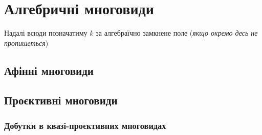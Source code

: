 \documentclass{math_library}
\begin{document}
%

\tableofcontents
\newpage

\section{Алгебричні многовиди}
Надалі всюди позначатиму $k$ за алгебраїчно замкнене поле (\textit{якщо окремо десь не пропишеться})

\subsection{Афінні многовиди}

\subsection{Проєктивні многовиди}

\subsubsection{Добутки в квазі-проєктивних многовидах}
\end{document}
